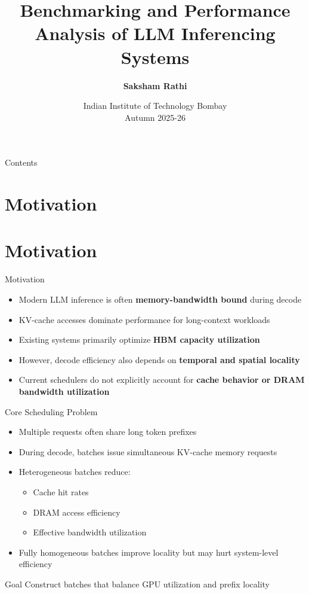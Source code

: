 \documentclass[Serif, 10pt, brown]{beamer}
\title[{Systems for LLMs}]{\sc Benchmarking and Performance Analysis of LLM Inferencing Systems}
\author[\ul{Saksham}]{{\textbf{Saksham Rathi}}}
\institute[UTD]{\sc\small Systems for LLMs\\ Under Prof. Mythili Vutukuru}
\date[UCI]{Indian Institute of Technology Bombay \\ Autumn 2025-26}
\theoremstyle{example}
\theoremstyle{plain}
\begin{document}
\frame{\titlepage}

\begin{frame}{Contents}
	\tableofcontents
\end{frame}

\section{Motivation}
\section{Motivation}
\begin{frame}{Motivation}
  \begin{itemize}
    \item Modern LLM inference is often \textbf{memory-bandwidth bound} during decode
    \item KV-cache accesses dominate performance for long-context workloads
    \item Existing systems primarily optimize \textbf{HBM capacity utilization}
    \item However, decode efficiency also depends on \textbf{temporal and spatial locality}
    \item Current schedulers do not explicitly account for \textbf{cache behavior or DRAM bandwidth utilization}
  \end{itemize}
\end{frame}

\begin{frame}{Core Scheduling Problem}
  \begin{itemize}
    \item Multiple requests often share long token prefixes
    \item During decode, batches issue simultaneous KV-cache memory requests
    \item Heterogeneous batches reduce:
      \begin{itemize}
        \item Cache hit rates
        \item DRAM access efficiency
        \item Effective bandwidth utilization
      \end{itemize}
    \item Fully homogeneous batches improve locality but may hurt system-level efficiency
  \end{itemize}
  \begin{block}{Goal}
    Construct batches that balance GPU utilization and prefix locality
  \end{block}
\end{frame}
\end{document}
